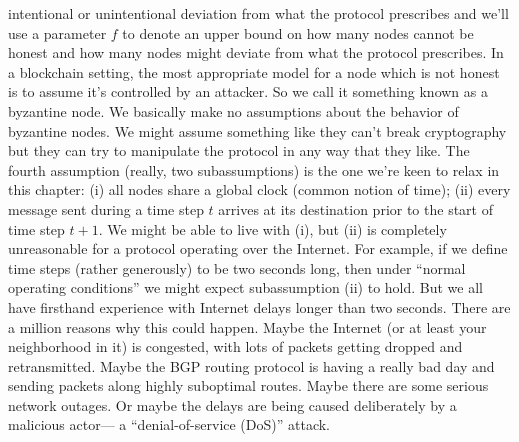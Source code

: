 intentional or unintentional deviation
from what the protocol prescribes and
we'll use a parameter $f$ to denote
an upper bound on how many nodes cannot
be honest and how many nodes might deviate from what the protocol prescribes. In a blockchain setting,
the most appropriate model for a
node which is not honest is to assume
it's controlled by an attacker. So we call it
something known as a byzantine node. We
basically make no assumptions about the
behavior of byzantine nodes. We might
assume something like they can't break
cryptography but they can try to
manipulate the protocol in any way that they like.
The fourth assumption (really, two subassumptions) is the one we’re keen to relax in this
chapter: (i) all nodes share a global clock (common notion of time); (ii) every message sent during a time step $t$ arrives
at its destination prior to the start of time step $t + 1$. We might be able to live with (i),
but (ii) is completely unreasonable for a protocol operating over the Internet. For example,
if we define time steps (rather generously) to be two seconds long, then under “normal
operating conditions” we might expect subassumption (ii) to hold. But we all have firsthand experience with Internet delays longer than two seconds. 
There are a million reasons why this could happen. Maybe the Internet (or at least your neighborhood in it) is congested,
with lots of packets getting dropped and retransmitted. Maybe the BGP routing protocol is
having a really bad day and sending packets along highly suboptimal routes. Maybe there
are some serious network outages. Or maybe the delays are being caused deliberately by a
malicious actor— a “denial-of-service (DoS)” attack.

